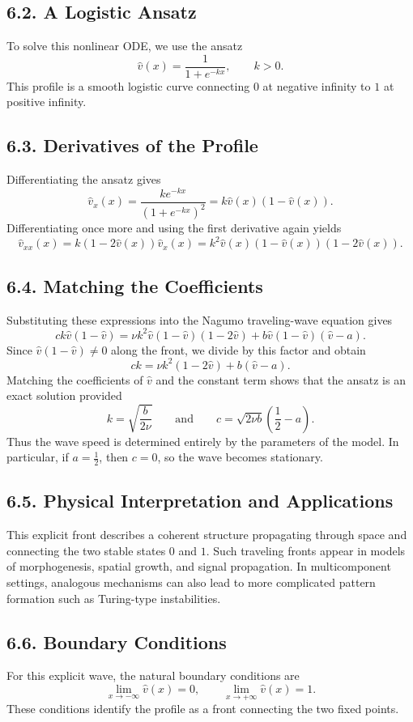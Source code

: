 \documentclass[11pt]{article}
\theoremstyle{definition}
\theoremstyle{remark}
\begin{document}
\subsection*{6.2. A Logistic Ansatz}
To solve this nonlinear ODE, we use the ansatz
\[
\hat v(x)=\frac{1}{1+e^{-kx}},
\qquad k>0.
\]
This profile is a smooth logistic curve connecting $0$ at negative infinity to $1$ at positive infinity.

\subsection*{6.3. Derivatives of the Profile}
Differentiating the ansatz gives
\[
\hat v_x(x)=\frac{ke^{-kx}}{(1+e^{-kx})^2}=k\hat v(x)(1-\hat v(x)).
\]
Differentiating once more and using the first derivative again yields
\[
\hat v_{xx}(x)=k(1-2\hat v(x))\hat v_x(x)
=
k^2\hat v(x)(1-\hat v(x))(1-2\hat v(x)).
\]

\subsection*{6.4. Matching the Coefficients}
Substituting these expressions into the Nagumo traveling-wave equation gives
\[
ck\hat v(1-\hat v)
=
\nu k^2\hat v(1-\hat v)(1-2\hat v)+b\hat v(1-\hat v)(\hat v-a).
\]
Since $\hat v(1-\hat v)\neq 0$ along the front, we divide by this factor and obtain
\[
ck=\nu k^2(1-2\hat v)+b(\hat v-a).
\]
Matching the coefficients of $\hat v$ and the constant term shows that the ansatz is an exact solution provided
\[
k=\sqrt{\frac{b}{2\nu}}
\qquad\text{and}\qquad
c=\sqrt{2\nu b}\left(\frac12-a\right).
\]
Thus the wave speed is determined entirely by the parameters of the model. In particular, if $a=\frac12$, then $c=0$, so the wave becomes stationary.

\subsection*{6.5. Physical Interpretation and Applications}
This explicit front describes a coherent structure propagating through space and connecting the two stable states $0$ and $1$. Such traveling fronts appear in models of morphogenesis, spatial growth, and signal propagation. In multicomponent settings, analogous mechanisms can also lead to more complicated pattern formation such as Turing-type instabilities.

\subsection*{6.6. Boundary Conditions}
For this explicit wave, the natural boundary conditions are
\[
\lim_{x\to-\infty}\hat v(x)=0,
\qquad
\lim_{x\to+\infty}\hat v(x)=1.
\]
These conditions identify the profile as a front connecting the two fixed points.
\end{document}
